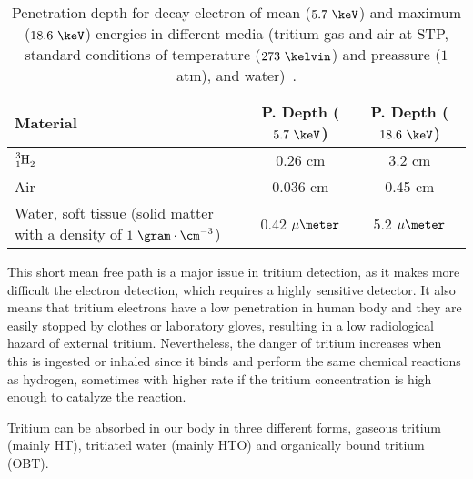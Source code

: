 \begin{table}[htbp]
\centering{}%
\begin{tabular}{lcc}
\toprule 
Material & P. Depth ($5.7~\keV$) & P. Depth ($18.6~\keV$) \tabularnewline
\midrule
\midrule 
$\ce{\ce{^{3}_{1}H_2}}$ & 0.26 cm & 3.2 cm \tabularnewline
Air & 0.036 cm & 0.45 cm \tabularnewline
\parbox{10em}{ Water, soft tissue\\  (solid matter with a \\  density of $1~\gram\cdot\cm^{-3}$)} & 0.42 $\mu\meter$ & 5.2 $\mu\meter$ \tabularnewline
\bottomrule
\end{tabular}
\caption{Penetration depth for decay electron of mean ($5.7~\keV$) and maximum ($18.6~\keV$) energies in different media (tritium gas and air at STP, standard conditions of temperature ($273~\kelvin$) and preassure ($1$ atm), and water)~\cite{MeanFreePathDocument}.}
\label{tab:MeanFreePathTritium}
\end{table}

This short mean free path is a major issue in tritium detection, as it makes more difficult the electron detection, which requires a highly sensitive detector. It also means that tritium electrons have a low penetration in human body and they are easily stopped by clothes or laboratory gloves, resulting in a low radiological hazard of external tritium. Nevertheless, the danger of tritium increases when this is ingested or inhaled since it binds and perform the same chemical reactions as hydrogen, sometimes with higher rate if the tritium concentration is high enough to catalyze the reaction. 

Tritium can be absorbed in our body in three different forms, gaseous tritium (mainly HT), tritiated water (mainly HTO) and organically bound tritium (OBT).

